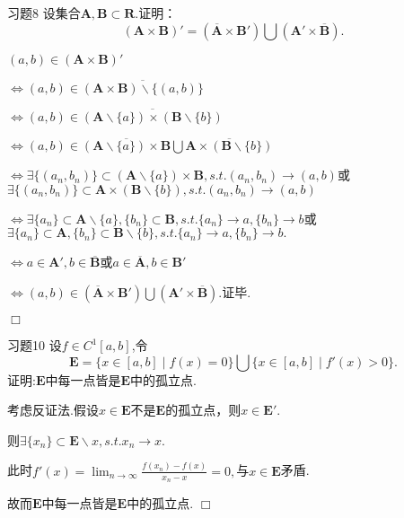 \documentclass[11pt, a4paper, twoside]{ctexbook}
\newenvironment{proof2}{{\noindent\heiti 证明}}{\hfill $\Box $\par}
\begin{document}
    \begin{myproposition}{习题8}{}
        设集合$\mathbf{A},\mathbf{B} \subset \mathbf{R}$.证明：$$(\mathbf{A}\times \mathbf{B})'=(\overline{\mathbf{A}}\times\mathbf{B'})\bigcup (\mathbf{A'}\times\overline{\mathbf{B}}).$$
    \end{myproposition}
    \begin{proof2}
        $(a,b)\in(\mathbf{A}\times \mathbf{B})'$ 
        
        $\Leftrightarrow(a,b)\in \overline{(\mathbf{A}\times \mathbf{B})\backslash{\{(a,b)\}}}$

        $\Leftrightarrow (a,b)\in \overline{(\mathbf{A}\backslash{\{a\}})\times (\mathbf{B}\backslash{\{b\}})}     $
        
        $\Leftrightarrow (a,b)\in \overline{(\mathbf{A}\backslash{\{a\}})\times \mathbf{B}} \bigcup \overline{ \mathbf{A}\times (\mathbf{B}\backslash{\{b\}})}$
        
        $\Leftrightarrow \exists \{(a_{n},b_{n})\}\subset (\mathbf{A}\backslash{\{a\}})\times \mathbf{B},s.t.(a_{n},b_{n}) \to (a,b)$或$\exists \{(a_{n},b_{n})\}\subset  \mathbf{A}\times (\mathbf{B}\backslash{\{b\}}),s.t.(a_{n},b_{n}) \to (a,b)$
   
        $\Leftrightarrow \exists \{a_{n}\}\subset \mathbf{A}\backslash\{a\},\{b_{n}\}\subset\mathbf{B},s.t.\{a_{n}\}\to a,\{b_{n}\} \to b$或$\exists \{a_{n}\}\subset \mathbf{A},\{b_{n}\}\subset\mathbf{B}\backslash\{b\},s.t.\{a_{n}\}\to a,\{b_{n}\} \to b.$

        $\Leftrightarrow a\in\mathbf{A'},b \in \overline{\mathbf{B}}$或$a\in \overline{\mathbf{A}},b\in \mathbf{B'}$

        $\Leftrightarrow (a,b) \in (\overline{\mathbf{A}}\times\mathbf{B'})\bigcup (\mathbf{A'}\times\overline{\mathbf{B}})$.证毕.

    \end{proof2}

    \begin{myproposition}{习题10}{}
		设$f\in C^{1}[a,b]$,令$$\mathbf{E}=\{x\in[a,b]\mid f(x)=0\}\bigcup\{x\in[a,b]\mid f'(x)>0\}.$$
		证明:$\mathbf{E}$中每一点皆是$\mathbf{E}$中的孤立点.
	\end{myproposition}
    \begin{proof2}
		考虑反证法.假设$x\in\mathbf{E}$不是$\mathbf{E}$的孤立点，则$x\in\mathbf{E'}$.	
        
        则$\exists \{x_{n}\} \subset \mathbf{E}\backslash{x},s.t.x_{n}\to x.$

		此时$f'(x)=\displaystyle\lim_{n \to \infty}\displaystyle\frac{f(x_{n})-f(x)}{x_{n}-x}=0,$与$x\in \mathbf{E}$矛盾.
		
		故而$\mathbf{E}$中每一点皆是$\mathbf{E}$中的孤立点.
	\end{proof2}
\end{document}
